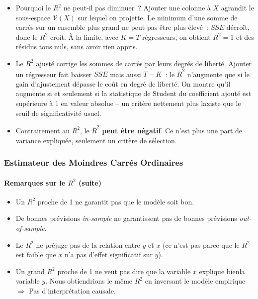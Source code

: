 \documentclass[10pt]{beamer}
\begin{document}
\begin{notes}

  \begin{itemize}

  \item Pourquoi le $R^2$ ne peut-il pas diminuer~? Ajouter une colonne à $X$ agrandit
    le sous-espace $\mathcal V(X)$ sur lequel on projette. Le minimum d'une somme de
    carrés sur un ensemble plus grand ne peut pas être plus élevé~: $SSE$ décroît, donc
    le $R^2$ croît. À la limite, avec $K=T$ régresseurs, on obtient $R^2=1$ et des
    résidus tous nuls, sans avoir rien appris.\newline

  \item Le $R^2$ ajusté corrige les sommes de carrés par leurs degrés de liberté.
    Ajouter un régresseur fait baisser $SSE$ mais aussi $T-K$~: le $\bar R^2$ n'augmente
    que si le gain d'ajustement dépasse le coût en degré de liberté. On montre qu'il
    augmente si et seulement si la statistique de Student du coefficient ajouté est
    supérieure à 1 en valeur absolue -- un critère nettement plus laxiste que le seuil
    de significativité usuel.\newline

  \item Contrairement au $R^2$, le $\bar R^2$ \textbf{peut être négatif}. Ce n'est plus
    une part de variance expliquée, seulement un critère de sélection.

  \end{itemize}

\end{notes}


\begin{frame}
  \frametitle{Estimateur des Moindres Carrés Ordinaires}
  \framesubtitle {Remarques sur le  $R^2$ (suite)}


  \begin{itemize}

  \item Un $R^2$ proche de 1 ne garantit pas que le modèle soit \guillemotleft bon\guillemotright.\newline

  \item De bonnes prévisions \textit{in-sample} ne garantissent pas de bonnes prévisions \textit{out-of-sample}.\newline

  \item Le $R^2$ ne préjuge pas de la relation entre $y$ et $x$ (ce n'est pas parce que le $R^2$ est faible que $x$ n'a pas d'effet significatif sur $y$).\newline

  \item Un grand $R^2$ proche de 1 ne veut pas dire que la variable $x$ explique  \guillemotleft bien\guillemotright  la variable $y$. Nous obtiendrions le même  $R^2$ en inversant le modèle empirique $\Rightarrow$ Pas d'interprétation causale.

  \end{itemize}

\end{frame}
\end{document}
